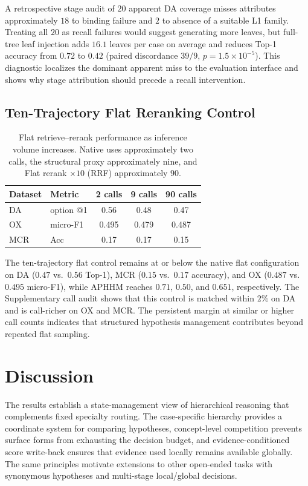 \documentclass[letterpaper]{article} %
\begin{document}
A retrospective stage audit of $20$ apparent DA coverage misses attributes approximately $18$ to binding failure and $2$ to absence of a suitable L1 family.
Treating all $20$ as recall failures would suggest generating more leaves, but full-tree leaf injection adds $16.1$ leaves per case on average and reduces Top-1 accuracy from $0.72$ to $0.42$ (paired discordance $39/9$, $p=1.5{\times}10^{-5}$).
This diagnostic localizes the dominant apparent miss to the evaluation interface and shows why stage attribution should precede a recall intervention.

\subsection{Ten-Trajectory Flat Reranking Control}
\label{sec:rq4}

\begin{table}[t]
\centering
\small
\begin{tabular}{@{}llccc@{}}
\toprule
Dataset & Metric & 2 calls & 9 calls & 90 calls \\
\midrule
DA & option @1 & 0.56 & 0.48 & 0.47 \\
OX & micro-F1 & 0.495 & 0.479 & 0.487 \\
MCR & Acc & 0.17 & 0.17 & 0.15 \\
\bottomrule
\end{tabular}
\caption{Flat retrieve--rerank performance as inference volume increases. Native uses approximately two calls, the structural proxy approximately nine, and Flat rerank $\times 10$ (RRF) approximately $90$.}
\label{tab:budget}

\end{table}

The ten-trajectory flat control remains at or below the native flat configuration on DA ($0.47$ vs.\ $0.56$ Top-1), MCR ($0.15$ vs.\ $0.17$ accuracy), and OX ($0.487$ vs.\ $0.495$ micro-F1), while APHHM reaches $0.71$, $0.50$, and $0.651$, respectively.
The Supplementary call audit shows that this control is matched within $2\%$ on DA and is call-richer on OX and MCR.
The persistent margin at similar or higher call counts indicates that structured hypothesis management contributes beyond repeated flat sampling.

\section{Discussion}
\label{sec:discussion}

The results establish a state-management view of hierarchical reasoning that complements fixed specialty routing.
The case-specific hierarchy provides a coordinate system for comparing hypotheses, concept-level competition prevents surface forms from exhausting the decision budget, and evidence-conditioned score write-back ensures that evidence used locally remains available globally.
The same principles motivate extensions to other open-ended tasks with synonymous hypotheses and multi-stage local/global decisions.
\end{document}
